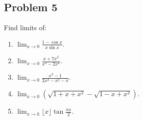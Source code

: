 \documentclass[11pt]{article}
\begin{document}
\subsection{Problem 5}
\label{sec-1-5}
Find limits of:
\begin{enumerate}
\item $\lim_{x \to 0}\frac{1 - \cos x}{x \sin x}$.
\item $\lim_{x \to 0}\frac{x + 7x^3}{x^3 - 2x^4}$.
\item $\lim_{x \to 0}\frac{x^2 - 1}{2x^3 - x^2 - x}$.
\item $\lim_{x \to 0}(\sqrt{1 + x + x^2} - \sqrt{1 - x + x^2})$.
\item $\lim_{x \to k}\lfloor x \rfloor \tan \frac{\pi x}{2}$.
\end{enumerate}
\end{document}
